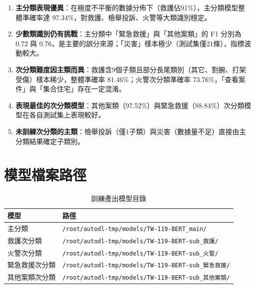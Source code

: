 \documentclass[UTF8,a4paper,11pt]{ctexart}
\begin{document}
\begin{enumerate}
  \item \textbf{主分類表現優異}：在極度不平衡的數據分佈下（救護佔91\%），主分類模型整體準確率達 97.34\%，對救護、檢舉投訴、火警等大類識別穩定。
  \item \textbf{少數類識別仍有挑戰}：主分類中「緊急救援」與「其他案類」的 F1 分別為 0.72 與 0.76，是主要的誤分來源；「災害」樣本極少（測試集僅21條），指標波動較大。
  \item \textbf{次分類難度因主類而異}：救護含9個子類且部分長尾類別（其它、割腕、打架受傷）樣本稀少，整體準確率 81.46\%；火警次分類準確率 73.76\%，「查看案件」與「集合住宅」存在一定混淆。
  \item \textbf{表現最佳的次分類模型}：其他案類（97.52\%）與緊急救援（88.84\%）次分類模型在各自測試集上表現較好。
  \item \textbf{未訓練次分類的主類}：檢舉投訴（僅1子類）與災害（數據量不足）直接由主分類結果確定子類別。
\end{enumerate}

\section{模型檔案路徑}

\begin{table}[htbp]
  \centering
  \caption{訓練產出模型目錄}
  \label{tab:model-paths}
  \small
  \begin{tabular}{ll}
    \toprule
    模型 & 路徑 \\
    \midrule
    主分類 & \texttt{/root/autodl-tmp/models/TW-119-BERT\_main/} \\
    救護次分類 & \texttt{/root/autodl-tmp/models/TW-119-BERT-sub\_救護/} \\
    火警次分類 & \texttt{/root/autodl-tmp/models/TW-119-BERT-sub\_火警/} \\
    緊急救援次分類 & \texttt{/root/autodl-tmp/models/TW-119-BERT-sub\_緊急救援/} \\
    其他案類次分類 & \texttt{/root/autodl-tmp/models/TW-119-BERT-sub\_其他案類/} \\
    \bottomrule
  \end{tabular}
\end{table}
\end{document}

